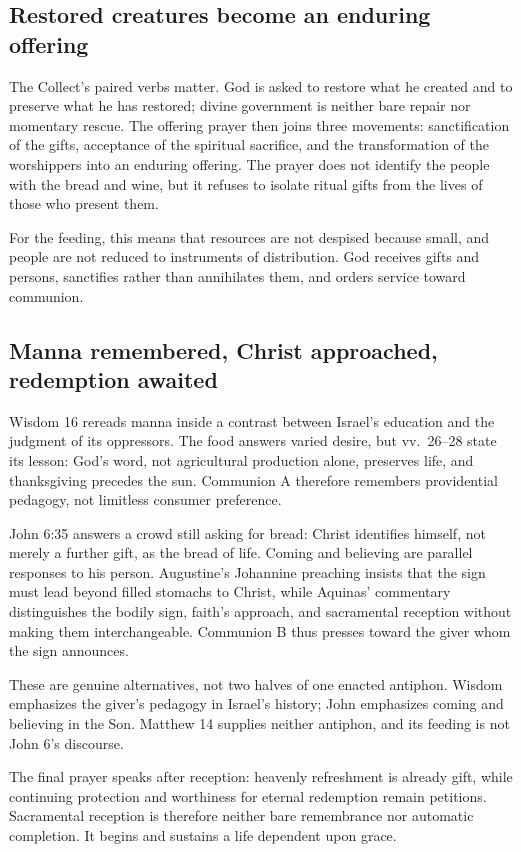 \subsection*{Restored creatures become an enduring offering\enspace{}}
The Collect's paired verbs matter. God is asked to restore what he created and
to preserve what he has restored; divine government is neither bare repair
nor momentary rescue. The offering prayer then joins three movements:
sanctification of the gifts, acceptance of the spiritual sacrifice, and the
transformation of the worshippers into an enduring offering. The prayer does
not identify the people with the bread and wine, but it refuses to isolate
ritual gifts from the lives of those who present them.

For the feeding, this means that resources are not despised because small, and people are not reduced to instruments of distribution. God receives gifts and persons, sanctifies rather than annihilates them, and orders service toward communion.

\subsection*{Manna remembered, Christ approached, redemption awaited\enspace{}}
Wisdom 16 rereads manna inside a contrast between Israel's education and the
judgment of its oppressors. The food answers varied desire, but vv.~26--28
state its lesson: God's word, not agricultural production alone, preserves
life, and thanksgiving precedes the sun. Communion A therefore remembers
providential pedagogy, not limitless consumer preference.

John 6:35 answers a crowd still asking for bread: Christ identifies himself,
not merely a further gift, as the bread of life. Coming and believing are
parallel responses to his person. Augustine's Johannine preaching insists
that the sign must lead beyond filled stomachs to Christ, while Aquinas'
commentary distinguishes the bodily sign, faith's approach, and sacramental
reception without making them interchangeable. Communion B thus presses
toward the giver whom the sign announces.

These are genuine alternatives, not two halves of one enacted antiphon.
Wisdom emphasizes the giver's pedagogy in Israel's history; John emphasizes
coming and believing in the Son. Matthew 14 supplies neither antiphon, and
its feeding is not John 6's discourse.

The final prayer speaks after reception: heavenly refreshment is already gift, while continuing protection and worthiness for eternal redemption remain petitions. Sacramental reception is therefore neither bare remembrance nor automatic completion. It begins and sustains a life dependent upon grace.
